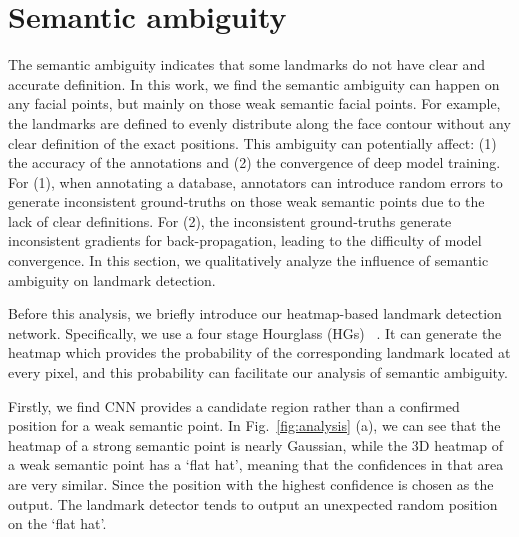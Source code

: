 \documentclass[10pt,twocolumn,letterpaper]{article}
\begin{document}
\section{Semantic ambiguity}
{
	{The semantic ambiguity indicates that some landmarks do not have clear and accurate definition.}
	In this work, we find 
the semantic ambiguity can happen on any facial points, but mainly on those weak semantic facial points. {For example, the   landmarks are defined to evenly distribute along the face contour without any clear definition of the exact positions.} This ambiguity can potentially affect: (1) the accuracy of the annotations and (2) the {convergence} of deep model training. For (1), when annotating a database, annotators can introduce random errors to generate inconsistent ground-truths on those weak semantic 
	points due to the lack of clear definitions.
For (2), the inconsistent ground-truths
{generate inconsistent}
	gradients for back-propagation, leading to the difficulty of model 
	convergence. In this section, we {qualitatively} analyze the influence of semantic ambiguity on landmark detection. 
}


Before this analysis, we briefly introduce our heatmap-based landmark detection network. Specifically, we use a  four stage Hourglass (HGs) ~\cite{newell2016stacked}. {It can generate the heatmap which provides the 
	probability of the corresponding landmark {located}  
at every pixel, and this probability can facilitate 
	our analysis of semantic ambiguity.}


Firstly, we find CNN provides a candidate region rather than a confirmed position for a weak semantic point. 
In Fig.~\ref{fig:analysis} (a), we can see that the heatmap of a strong semantic point is nearly Gaussian, 
while the 3D heatmap of a weak semantic point has a `flat hat', meaning that the confidences in that area are very similar. Since 
the position with the highest confidence is chosen as the output. The landmark detector tends to output 
an unexpected random position on the `flat hat'.
\end{document}
